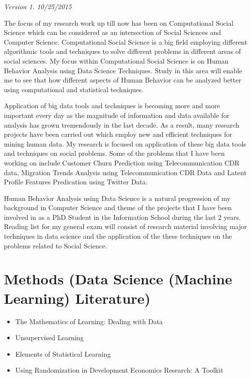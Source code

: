 \textit{Version 1. 10/25/2015} 

The focus of my research work up till now has been on Computational Social Science which can be considered as an intersection of Social Sciences and Computer Science. Computational Social Science is a big field employing different algorithmic tools and techniques to solve different problems in different areas of social sciences. My focus within Computational Social Science is on Human Behavior Analysis using Data Science Techniques. Study in this area will enable me to see that how different aspects of Human Behavior can be analyzed better using computational and statistical techniques.

Application of big data tools and techniques is becoming more and more important every day as the magnitude of information and data available for analysis has grown tremendously in the last decade. As a result, many research projects have been carried out which employ new and efficient techniques for mining human data. My research is focused on application of these big data tools and techniques on social problems. Some of the problems that I have been working on include Customer Churn Prediction using Telecommunication CDR data, Migration Trends Analysis using Telecommunication CDR Data  and Latent Profile Features Predication using Twitter Data.

Human Behavior Analysis using Data Science is a natural progression of my background in Computer Science and theme of the projects that I have been involved in as a PhD Student in the Information School during the last 2 years. 
Reading list for my general exam will consist of research material involving major techniques in data science and the application of the these techniques on the problems related to Social Science. 

\section{Methods (Data Science (Machine Learning) Literature)}
\begin{itemize}
\item The Mathematics of Learning: Dealing with Data\cite{Poggio_2005}
\end{itemize}
\begin{itemize}
\item Unsupervised Learning \cite{Ghahramani_2004}
\end{itemize}
\begin{itemize}
\item Elements of Statistical Learning \cite{StatisticalLearning_2009}
\end{itemize}
\begin{itemize}
\item Using Randomization in Development Economics Research: A Toolkit \cite{Duflo} 
\end{itemize}


